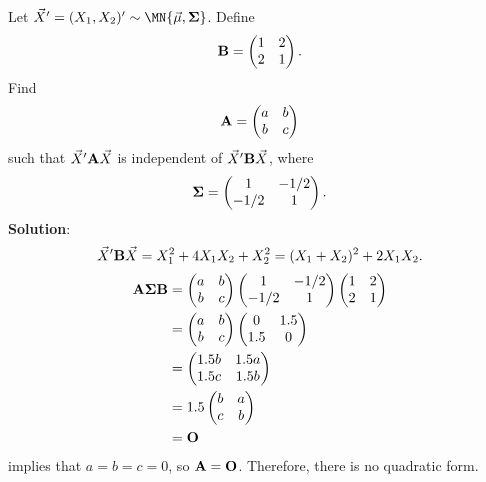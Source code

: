 \begin{Example}{}{}
    Let $ \Vector{X}'=(X_1,X_2)' \sim \MN{\Vector{\mu},\Matrix{\Sigma}} $. Define
    \[ \mathbf{B}=\begin{pmatrix}
            1 & 2 \\
            2 & 1
        \end{pmatrix}. \]
    Find
    \[ \mathbf{A}=\begin{pmatrix}
            a & b \\
            b & c
        \end{pmatrix} \]
    such that $ \vec{X}'\mathbf{A}\vec{X} $ is independent of
    $ \vec{X}'\mathbf{B}\vec{X} $, where
    \[ \mathbf{\Sigma}=\begin{pmatrix}
            1    & -1/2 \\
            -1/2 & 1
        \end{pmatrix}. \]
    \tcblower{}
    \textbf{Solution}:
    \[ \vec{X}'\mathbf{B}\vec{X}=X_1^2+4X_1X_2+X_2^2=(X_1+X_2)^2+2X_1X_2. \]
    \begin{align*}
        \mathbf{A\Sigma B}
         & =\begin{pmatrix}
                a & b \\
                b & c
            \end{pmatrix} \begin{pmatrix}
                              1    & -1/2 \\
                              -1/2 & 1
                          \end{pmatrix}\begin{pmatrix}
                                           1 & 2 \\
                                           2 & 1
                                       \end{pmatrix} \\
         & =\begin{pmatrix}
                a & b \\
                b & c
            \end{pmatrix}\begin{pmatrix}
                             0   & 1.5 \\
                             1.5 & 0
                         \end{pmatrix}               \\
         & =\begin{pmatrix}
                1.5b & 1.5a \\
                1.5c & 1.5b
            \end{pmatrix}                            \\
         & =1.5 \begin{pmatrix}
                    b & a \\
                    c & b
                \end{pmatrix}                        \\
         & =\mathbf{O}
    \end{align*}
    implies that $ a=b=c=0 $, so $ \mathbf{A}=\mathbf{O} $. Therefore, there
    is no quadratic form.
\end{Example}